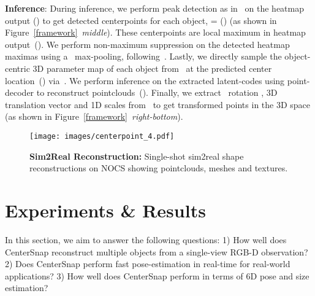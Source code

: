 \documentclass[letter, 10pt, conference]{ieeeconf}
\begin{document}
\textbf{Inference}:
During inference, we perform peak detection as in~\cite{zhou2019objects} on the heatmap output () to get detected centerpoints for each object, {  } = () (as shown in Figure~\ref{framework}~\emph{middle}). These centerpoints are local maximum in heatmap output~(). We perform non-maximum suppression on the detected heatmap maximas using a~ max-pooling, following~\cite{zhou2019objects}. Lastly, we directly sample the object-centric 3D parameter map of each object from~ at the predicted center location~() via~. We perform inference on the extracted latent-codes using point-decoder to reconstruct pointclouds~(). Finally, we extract~ rotation , 3D translation vector  and 1D scales  from~ to get transformed points in the 3D space  (as shown in Figure~\ref{framework}~\emph{right-bottom}).
\begin{figure}[t!]
\centering
\texttt{[image: images/centerpoint\_4.pdf]}
\centering
  \caption{
  \textbf{Sim2Real Reconstruction:} Single-shot sim2real shape reconstructions on NOCS showing pointclouds, meshes and textures.
  }
  \label{reconstruction_qualitative}
\end{figure}
\section{Experiments \& Results} 
\label{experiments&results}
In this section, we aim to answer the following questions: 1) How well does CenterSnap reconstruct multiple objects from a single-view RGB-D observation? 2) Does CenterSnap perform fast pose-estimation in real-time for real-world applications? 3) How well does CenterSnap perform in terms of 6D pose and size estimation? 
\end{document}
